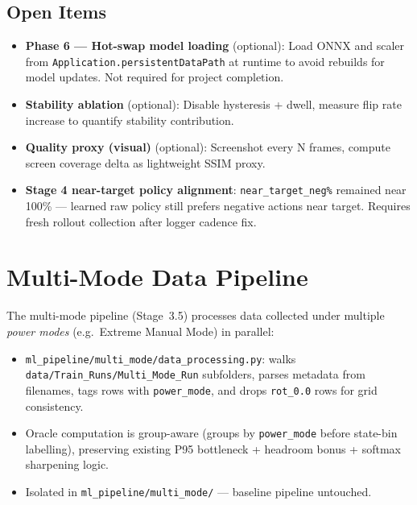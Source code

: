 \documentclass[12pt, a4paper]{article}
\begin{document}
\subsection{Open Items}

\begin{itemize}
  \item \textbf{Phase 6 — Hot-swap model loading} (optional): Load ONNX and
    scaler from \texttt{Application.persistentDataPath} at runtime to avoid
    rebuilds for model updates. Not required for project completion.
  \item \textbf{Stability ablation} (optional): Disable hysteresis + dwell,
    measure flip rate increase to quantify stability contribution.
  \item \textbf{Quality proxy (visual)} (optional): Screenshot every N frames,
    compute screen coverage delta as lightweight SSIM proxy.
  \item \textbf{Stage 4 near-target policy alignment}: \texttt{near\_target\_neg\%}
    remained near 100\% — learned raw policy still prefers negative actions near
    target. Requires fresh rollout collection after logger cadence fix.
\end{itemize}

\section{Multi-Mode Data Pipeline}
\label{sec:multimode}

The multi-mode pipeline (Stage~3.5) processes data collected under multiple
\emph{power modes} (e.g.\ Extreme Manual Mode) in parallel:

\begin{itemize}
  \item \texttt{ml\_pipeline/multi\_mode/data\_processing.py}: walks
    \texttt{data/Train\_Runs/Multi\_Mode\_Run} subfolders, parses metadata from
    filenames, tags rows with \texttt{power\_mode}, and drops \texttt{rot\_0.0}
    rows for grid consistency.
  \item Oracle computation is group-aware (groups by \texttt{power\_mode} before
    state-bin labelling), preserving existing P95 bottleneck + headroom bonus
    + softmax sharpening logic.
  \item Isolated in \texttt{ml\_pipeline/multi\_mode/} — baseline pipeline
    untouched.
\end{itemize}

\end{document}
